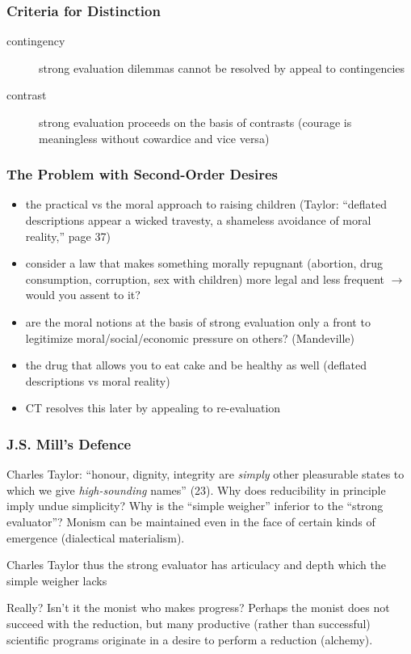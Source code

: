 \documentclass[xcolor=dvipsnames]{beamer}
\begin{document}
\begin{frame}
  \frametitle{Criteria for Distinction}
  \begin{description}
  \item[contingency] strong evaluation dilemmas cannot be resolved by appeal to contingencies
  \item[contrast] strong evaluation proceeds on the basis of
    contrasts (courage is meaningless without cowardice and vice
    versa)
  \end{description}
\end{frame}

\begin{frame}
  \frametitle{The Problem with Second-Order Desires}
\begin{itemize}
\item the practical vs the moral approach to raising children (Taylor:
  ``deflated descriptions appear a wicked travesty, a shameless
  avoidance of moral reality,'' page 37)
\item consider a law that makes something morally repugnant
  (abortion, drug consumption, corruption, sex with children) more
  legal and less frequent $\longrightarrow$ would you assent to it?
\item are the moral notions at the basis of strong evaluation only
  a front to legitimize moral/social/economic pressure on others?
  (Mandeville)
\item the drug that allows you to eat cake and be healthy as well
  (deflated descriptions vs moral reality)
\item CT resolves this later by appealing to re-evaluation
\end{itemize}
\end{frame}

\begin{frame}
  \frametitle{J.S. Mill's Defence}
  Charles Taylor: ``honour, dignity, integrity are \emph{simply}
  other pleasurable states to which we give \emph{high-sounding}
  names'' (23). Why does reducibility in principle imply undue
  simplicity? Why is the ``simple weigher'' inferior to the
  ``strong evaluator''? Monism can be maintained even in the face
  of certain kinds of emergence (dialectical materialism).
  \begin{block}{Charles Taylor}
    thus the strong evaluator has articulacy and depth which the
    simple weigher lacks
  \end{block}
Really? Isn't it the monist who makes progress? Perhaps the monist
does not succeed with the reduction, but many productive (rather
than successful) scientific programs originate in a desire to
perform a reduction (alchemy). 
\end{frame}
\end{document}
